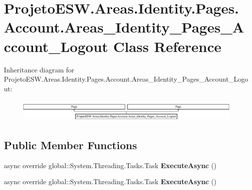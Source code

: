 \hypertarget{class_projeto_e_s_w_1_1_areas_1_1_identity_1_1_pages_1_1_account_1_1_areas___identity___pages___account___logout}{}\section{Projeto\+E\+S\+W.\+Areas.\+Identity.\+Pages.\+Account.\+Areas\+\_\+\+Identity\+\_\+\+Pages\+\_\+\+Account\+\_\+\+Logout Class Reference}
\label{class_projeto_e_s_w_1_1_areas_1_1_identity_1_1_pages_1_1_account_1_1_areas___identity___pages___account___logout}
Inheritance diagram for Projeto\+E\+S\+W.\+Areas.\+Identity.\+Pages.\+Account.\+Areas\+\_\+\+Identity\+\_\+\+Pages\+\_\+\+Account\+\_\+\+Logout\+:\begin{figure}[H]
\begin{center}
\leavevmode
\includegraphics[height=1.154639cm]{class_projeto_e_s_w_1_1_areas_1_1_identity_1_1_pages_1_1_account_1_1_areas___identity___pages___account___logout}
\end{center}
\end{figure}
\subsection*{Public Member Functions}
\begin{DoxyCompactItemize}
\item 
\mbox{\label{class_projeto_e_s_w_1_1_areas_1_1_identity_1_1_pages_1_1_account_1_1_areas___identity___pages___account___logout_a4831bc3766548c40ae1f68e764fc0fac}} 
async override global\+::\+System.\+Threading.\+Tasks.\+Task {\bfseries Execute\+Async} ()
\item 
\mbox{\label{class_projeto_e_s_w_1_1_areas_1_1_identity_1_1_pages_1_1_account_1_1_areas___identity___pages___account___logout_a4831bc3766548c40ae1f68e764fc0fac}} 
async override global\+::\+System.\+Threading.\+Tasks.\+Task {\bfseries Execute\+Async} ()
\end{DoxyCompactItemize}
